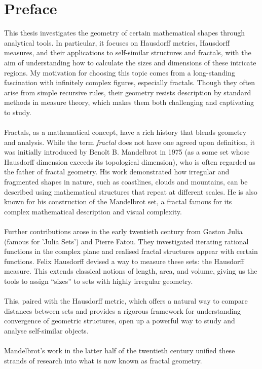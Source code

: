 \documentclass{article}
\theoremstyle{plain}
\theoremstyle{definition}
\theoremstyle{remark}
\begin{document}
\section*{Preface}
This thesis investigates the geometry of certain mathematical shapes through analytical tools. In particular, it focuses on Hausdorff metrics, Hausdorff measures, and their applications to self-similar structures and fractals, with the aim of understanding how to calculate the sizes and dimensions of these intricate regions. My motivation for choosing this topic comes from a long-standing fascination with infinitely complex figures, especially fractals. Though they often arise from simple recursive rules, their geometry resists description by standard methods in measure theory, which makes them both challenging and captivating to study.
~\\~\\
Fractals, as a mathematical concept, have a rich history that blends geometry and analysis. While the term \textit{fractal} does not have one agreed upon definition, it was initially introduced by Benoît B. Mandelbrot in 1975 (as a some set whose Hausdorff dimension exceeds its topological dimension), who is often regarded as the father of fractal geometry. His work demonstrated how irregular and fragmented shapes in nature, such as coastlines, clouds and mountains, can be described using mathematical structures that repeat at different scales. He is also known for his construction of the Mandelbrot set, a fractal famous for its complex mathematical description and visual complexity. 
~\\~\\
Further contributions arose in the early twentieth century from Gaston Julia (famous for 'Julia Sets') and Pierre Fatou. They investigated iterating rational functions in the complex plane and realised fractal structures appear with certain functions. Felix Hausdorff devised a way to measure these sets: the Hausdorff measure. This extends classical notions of length, area, and volume, giving us the tools to assign “sizes” to sets with highly irregular geometry.
~\\~\\
This, paired with the Hausdorff metric, which offers a natural way to compare distances between sets and provides a rigorous framework for understanding convergence of geometric structures, open up a powerful way to study and analyse self-similar objects.
~\\ ~\\
Mandelbrot's work in the latter half of the twentieth century unified these strands of research into what is now known as fractal geometry.
\end{document}
